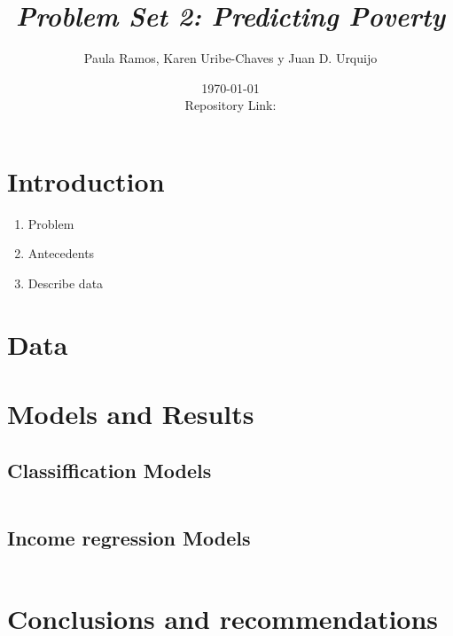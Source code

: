 \documentclass[12pt,a4paper,onecolumn]{article}
\title{\bf \emph{Problem Set 2: Predicting Poverty}}
\author{Paula Ramos, Karen Uribe-Chaves y Juan D. Urquijo}
\date{\today \\ Repository Link:\href{https://github.com/KarenUC/ProblemSet2_Ramos_Uribe_Urquijo} {\color{blue}{\it Github}}}
\begin{document}
\maketitle


\section{Introduction} \label{sec:intro}



\begin{enumerate}
    \item Problem
    \item Antecedents
    \item Describe data
    
\end{enumerate}

\section{Data} \label{sec:data}


\section{Models and Results}\label{sec:sec3}

\subsection{Classiffication Models}

\begin{equation}
\end{equation}


\subsection{Income regression Models}

\begin{equation}
\end{equation}


\section{Conclusions and recommendations}



\end{document}
